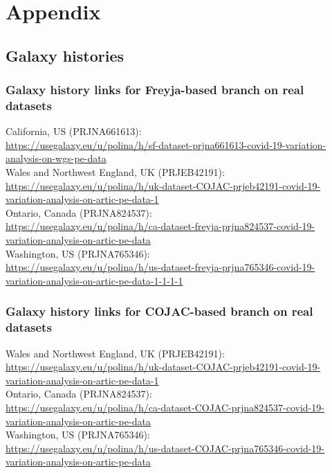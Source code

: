 %
\section{Appendix} \label{sec:appendix}
    \subsection{Galaxy histories} \label{sec:appendix:galaxy-hist}
    \subsubsection{Galaxy history links for Freyja-based branch on real datasets}
    California, US (PRJNA661613): \\
   \url{https://usegalaxy.eu/u/polina/h/sf-dataset-prjna661613-covid-19-variation-analysis-on-wgs-pe-data}\\
    Wales and Northwest England, UK (PRJEB42191): \\
    \url{https://usegalaxy.eu/u/polina/h/uk-dataset-COJAC-prjeb42191-covid-19-variation-analysis-on-artic-pe-data-1}\\
    Ontario, Canada (PRJNA824537): \\
    \url{https://usegalaxy.eu/u/polina/h/ca-dataset-freyja-prjna824537-covid-19-variation-analysis-on-artic-pe-data}\\
    Washington, US (PRJNA765346): \\
    \url{https://usegalaxy.eu/u/polina/h/us-dataset-freyja-prjna765346-covid-19-variation-analysis-on-artic-pe-data-1-1-1-1}

    \subsubsection{Galaxy history links for COJAC-based branch on real datasets}
    Wales and Northwest England, UK (PRJEB42191): \\
    \url{https://usegalaxy.eu/u/polina/h/uk-dataset-COJAC-prjeb42191-covid-19-variation-analysis-on-artic-pe-data-1}\\
    Ontario, Canada (PRJNA824537): \\
    \url{https://usegalaxy.eu/u/polina/h/ca-dataset-COJAC-prjna824537-covid-19-variation-analysis-on-artic-pe-data}\\
    Washington, US (PRJNA765346): \\
    \url{https://usegalaxy.eu/u/polina/h/us-dataset-COJAC-prjna765346-covid-19-variation-analysis-on-artic-pe-data}
    
